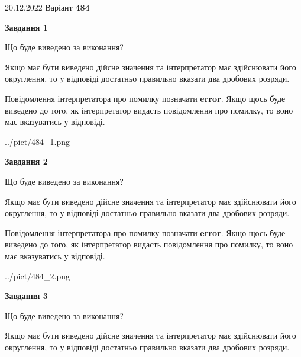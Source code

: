 \documentclass[12pt, ukrainian]{article}
\begin{document}
{20.12.2022 Варіант \No \textbf { 484 }\par}
{
\begin {Large}

{\begin {center}\textbf{Завдання 1}\end {center}}\par
Що буде виведено за виконання? \par

Якщо має бути виведено дійсне значення та інтерпретатор має здійснювати його округлення, 
то у відповіді достатньо правильно вказати два дробових розряди.

Повідомлення інтерпретатора про помилку позначати \textbf{error}.
Якщо щось буде виведено до того, як інтерпретатор видасть повідомлення про помилку, 
то воно має вказуватись у відповіді. \par

\begin{center}
	{../pict/484_1.png}
\end{center}
\newpage

{\begin {center}\textbf{Завдання 2}\end {center}}\par
Що буде виведено за виконання? \par

Якщо має бути виведено дійсне значення та інтерпретатор має здійснювати його округлення, 
то у відповіді достатньо правильно вказати два дробових розряди.

Повідомлення інтерпретатора про помилку позначати \textbf{error}.
Якщо щось буде виведено до того, як інтерпретатор видасть повідомлення про помилку, 
то воно має вказуватись у відповіді. \par

\begin{center}
	{../pict/484_2.png}
\end{center}
\newpage

{\begin {center}\textbf{Завдання 3}\end {center}}\par
Що буде виведено за виконання? \par

Якщо має бути виведено дійсне значення та інтерпретатор має здійснювати його округлення, 
то у відповіді достатньо правильно вказати два дробових розряди.


\end{Large}}
\end{document}
